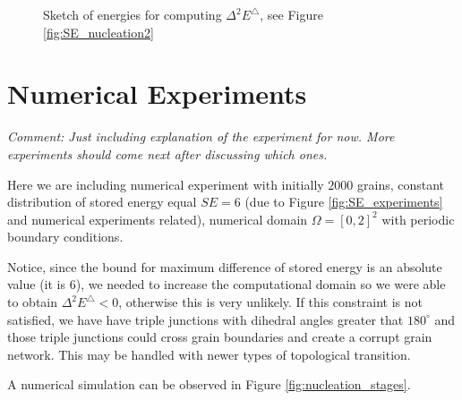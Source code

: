\begin{figure}[t]
{
    \label{fig:delta2_2}
    }
    \caption{Sketch of energies for computing $\Delta^2 E^{\triangle}$, see Figure \ref{fig:SE_nucleation2}}
    \label{fig:delta2}
\end{figure}

\section{Numerical Experiments}

\emph{Comment: Just including explanation of the
experiment for now. More experiments should
come next after discussing which ones.}

Here we are including numerical experiment
with initially $2000$ grains, constant
distribution of stored energy equal $SE=6$
(due to Figure \ref{fig:SE_experiments} and numerical experiments related),
numerical domain $\Omega=[0,2]^2$
with periodic boundary conditions.

Notice, since the bound for maximum difference of
stored energy is an absolute value (it is $6$), 
we needed to increase the computational domain
so we were able to obtain $\Delta^2 E^{\triangle}<0$,
otherwise this is very unlikely.
If this constraint is not satisfied,
we have have triple junctions with dihedral
angles greater that $180^{\circ}$ and
those triple junctions could cross grain
boundaries and create a corrupt grain
network. This may be handled with newer
types of topological transition.

A numerical simulation can be observed
in Figure \ref{fig:nucleation_stages}.

